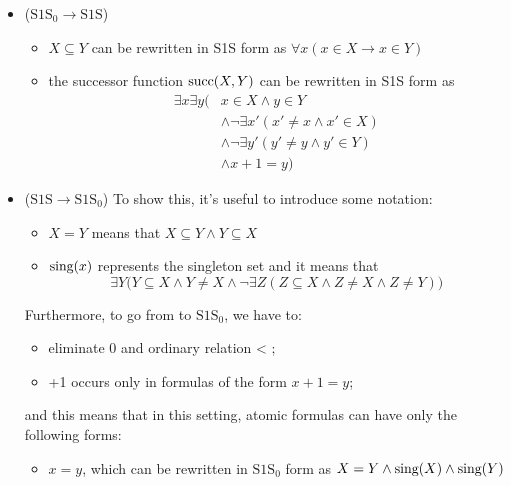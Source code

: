 \documentclass[oneside]{academica}
\begin{document}
\begin{proof*}
  \begin{itemize}
    \item[\color{pink!200}$\Leftarrow$] ($\text{S1S}_0 \to \text{S1S}$)
      \begin{itemize}
        \item $X \subseteq Y$ can be rewritten in S1S form as $\forall x \left( x \in X \to x \in Y \right)$
        \item the successor function $\text{succ}(X,Y)$ can be rewritten in S1S form as 
          \begin{align*}
            \exists x \exists y \Big( &x \in X \land y \in Y \\
              &\land \neg\exists x' (x' \neq x \land x' \in X) \\
              &\land \neg\exists y' (y' \neq y \land y' \in Y) \\
              &\land x+1 = y \Big)
          \end{align*}
      \end{itemize}
    \pagebreak
    \item[\color{pink!200}$\Rightarrow$] ($\text{S1S} \to \text{S1S}_0$)
      To show this, it's useful to introduce some notation:
      \begin{itemize}
        \item $X = Y$ means that $X \subseteq Y \land Y \subseteq X$
        \item $\text{sing}(x)$ represents the singleton set and it means that
          \begin{equation*}
            \exists Y \Big( Y \subseteq X \land Y \neq X \land \neg\exists Z (Z \subseteq X \land Z \neq X \land Z \neq Y) \Big)
          \end{equation*}
      \end{itemize}
      \vspace{-5pt}
      Furthermore, to go from  to $\text{S1S}_0$, we have to:
      \begin{itemize}
        \item eliminate 0 and ordinary relation < ;
        \item +1 occurs only in formulas of the form $x+1 = y$;
      \end{itemize}
      and this means that in this setting, atomic formulas can have only the following forms:
      \begin{itemize}
        \item $x = y$, which can be rewritten in $\text{S1S}_0$ form as $X = Y \land \text{sing}(X) \land \text{sing}(Y)$

\end{itemize}
\end{itemize}
\end{proof*}
\end{document}
